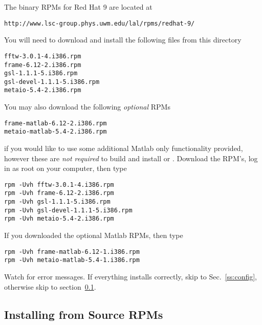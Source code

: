 The binary RPMs for Red Hat 9 are located at
\begin{verbatim}
http://www.lsc-group.phys.uwm.edu/lal/rpms/redhat-9/
\end{verbatim}
You will need to download and install the following files from this directory
\begin{verbatim}
fftw-3.0.1-4.i386.rpm
frame-6.12-2.i386.rpm
gsl-1.1.1-5.i386.rpm
gsl-devel-1.1.1-5.i386.rpm
metaio-5.4-2.i386.rpm
\end{verbatim}
You may also download the following \emph{optional} RPMs 
\begin{verbatim}
frame-matlab-6.12-2.i386.rpm
metaio-matlab-5.4-2.i386.rpm
\end{verbatim}
if you would like to use some additional Matlab only functionality provided,
however these are \emph{not required} to build and install \lal or \lalapps.
Download the RPM's, log in as root on your computer, then type
\begin{verbatim}
rpm -Uvh fftw-3.0.1-4.i386.rpm
rpm -Uvh frame-6.12-2.i386.rpm
rpm -Uvh gsl-1.1.1-5.i386.rpm
rpm -Uvh gsl-devel-1.1.1-5.i386.rpm
rpm -Uvh metaio-5.4-2.i386.rpm
\end{verbatim}
If you downloaded the optional Matlab RPMs, then type
\begin{verbatim}
rpm -Uvh frame-matlab-6.12-1.i386.rpm
rpm -Uvh metaio-matlab-5.4-1.i386.rpm
\end{verbatim}
Watch for error messages.   If everything installs correctly,  skip to
Sec.~\ref{ss:config}, otherwise skip to section~\ref{ss:srpm}.

\subsection{Installing from Source RPMs}
\label{ss:srpm}

